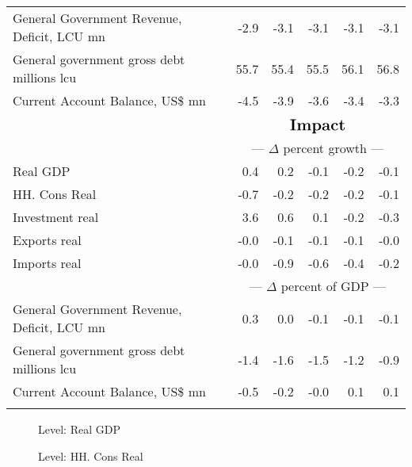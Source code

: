 \documentclass{article}
\begin{document}
\begin{table}[ht]
\begin{tabular}{lrrrrr}
General Government Revenue, Deficit, LCU mn & -2.9 & -3.1 & -3.1 & -3.1 & -3.1 \\
General government gross debt millions lcu & 55.7 & 55.4 & 55.5 & 56.1 & 56.8 \\
Current Account Balance, US\$ mn & -4.5 & -3.9 & -3.6 & -3.4 & -3.3 \\
&\multicolumn{5}{c}{{ }}                                                                                                     \\
&\multicolumn{5}{c}{{$\Large \textbf{Impact}$}}                                                                                                     \\
&\multicolumn{5}{c}{{--- $\Delta$  percent growth ---}}                                                                                                     \\
Real GDP & 0.4 & 0.2 & -0.1 & -0.2 & -0.1 \\
HH. Cons Real & -0.7 & -0.2 & -0.2 & -0.2 & -0.1 \\
Investment real & 3.6 & 0.6 & 0.1 & -0.2 & -0.3 \\
Exports real & -0.0 & -0.1 & -0.1 & -0.1 & -0.0 \\
Imports real & -0.0 & -0.9 & -0.6 & -0.4 & -0.2 \\
&\multicolumn{5}{c}{{--- $\Delta$  percent of GDP ---}}                                                                                                     \\
General Government Revenue, Deficit, LCU mn & 0.3 & 0.0 & -0.1 & -0.1 & -0.1 \\
General government gross debt millions lcu & -1.4 & -1.6 & -1.5 & -1.2 & -0.9 \\
Current Account Balance, US\$ mn & -0.5 & -0.2 & -0.0 & 0.1 & 0.1 \\
&\multicolumn{5}{c}{{ }}                                                                                                     \\
\bottomrule
\end{tabular}
\end{table}
 
\begin{figure}[htbp]
\centering
\resizebox{\textwidth}{!}{}
\caption{Level: Real GDP}
\end{figure}

 
\begin{figure}[htbp]
\centering
\resizebox{\textwidth}{!}{}
\caption{Level: HH. Cons Real}
\end{figure}
\end{document}
